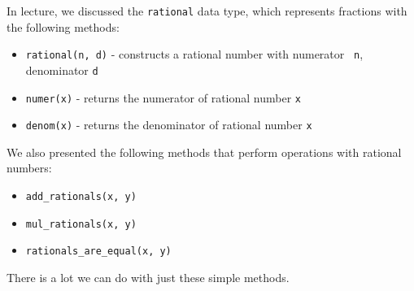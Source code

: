In lecture, we discussed the {\tt rational} data type, which represents
fractions with the following methods:

\begin{itemize}
\item {\tt rational(n, d)} - constructs a rational number with numerator {\tt
n}, denominator {\tt d}
\item {\tt numer(x)} - returns the numerator of rational number {\tt x}
\item {\tt denom(x)} - returns the denominator of rational number {\tt x}
\end{itemize}

We also presented the following methods that perform operations with rational
numbers:

\begin{itemize}
\item {\tt add\_rationals(x, y)}
\item {\tt mul\_rationals(x, y)}
\item {\tt rationals\_are\_equal(x, y)}
\end{itemize}

There is a lot we can do with just these simple methods.

